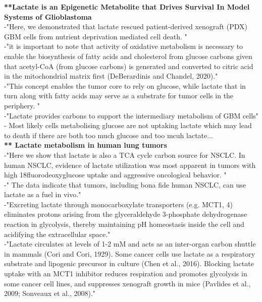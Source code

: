 \documentclass[11pt,a4paper]{article}
\begin{document}
\textbf{**Lactate is an Epigenetic Metabolite that Drives Survival In Model Systems of Glioblastoma}\\

-"Here, we demonstrated that lactate rescued patient-derived xenograft (PDX) GBM cells from nutrient deprivation mediated cell death. "\\

-"it is important to note that activity of oxidative metabolism is necessary to enable the biosynthesis of fatty acids and cholesterol from glucose carbons given that acetyl-CoA (from glucose carbons) is generated and converted to citric acid in the mitochondrial matrix first (DeBerardinis and Chandel, 2020)."\\

-"This concept enables the tumor core to rely on glucose, while lactate that in turn along with fatty acids may serve as a substrate for tumor cells in the periphery. "\\

-"Lactate provides carbons to support the intermediary metabolism of GBM cells"\\

- Most likely  cells metabolising glucose are not uptaking lactate which may lead to death if there are both too much glucose and too mcuh lactate...\\

\textbf{** Lactate metabolism in human lung tumors}\\

-"Here we show that lactate is also a TCA cycle carbon source for NSCLC. In human NSCLC, evidence of lactate utilization was most apparent in tumors with high 18fluorodeoxyglucose uptake and aggressive oncological behavior. "\\

-" The data indicate that tumors, including bona fide human NSCLC, can use lactate as a fuel in vivo."\\

-"Excreting lactate through monocarboxylate transporters (e.g. MCT1, 4) eliminates protons arising from the glyceraldehyde 3-phosphate dehydrogenase reaction in glycolysis, thereby maintaining pH homeostasis inside the cell and acidifying the extracellular space."\\

-"Lactate circulates at levels of 1-2 mM and acts as an inter-organ carbon shuttle in mammals (Cori and Cori, 1929). Some cancer cells use lactate as a respiratory substrate and lipogenic precursor in culture (Chen et al., 2016). Blocking lactate uptake with an MCT1 inhibitor reduces respiration and promotes glycolysis in some cancer cell lines, and suppresses xenograft growth in mice (Pavlides et al., 2009; Sonveaux et al., 2008)."\\
\end{document}
